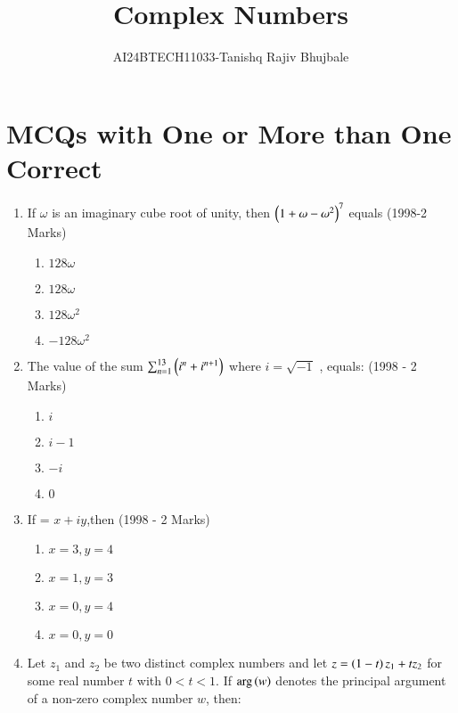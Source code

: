 \documentclass[journal,12pt,twocolumn]{IEEEtran}
\theoremstyle{remark}
\begin{document}

\vspace{3cm}
\title{Complex Numbers}
\author{AI24BTECH11033-Tanishq Rajiv Bhujbale}
\maketitle
\newpage
\bigskip

\renewcommand{\thefigure}{\theenumi}
\renewcommand{\thetable}{\theenumi}

\section{MCQs with One or More than One Correct}
\begin{enumerate}
    \item If $\omega$ is an imaginary cube root of unity, then 
    $\left(1 + \omega - \omega^2\right)^7$ equals \hfill (1998-2 Marks)
    \begin{enumerate}[label=(\alph*)]
    \item $128\omega$    
    \item $128\omega$
    \item $128\omega^2$
    \item $-128\omega^2$
    \end{enumerate}
    \item The value of the sum 
   $\sum_{n=1}^{13} \left(i^n + i^{n+1}\right)$
where  $i = \sqrt{-1}$ , equals: \hfill (1998 - 2 Marks)
\begin{multicols}{4}
    \begin{enumerate}[label=(\alph*)]
    \item $i$
    \item $i - 1$
    \item $-i$
    \item $0$
    \end{enumerate}
\end{multicols}
    \item If 
    = $ x + iy $,then \hfill (1998 - 2 Marks)
\begin{enumerate}[label=(\alph*)]
    \item $x=3,y=4$    
    \item $x=1,y=3$ 
    \item $x=0,y=4$
    \item $x=0,y=0$
    \end{enumerate}
    \item Let $ z_1 $ and $ z_2 $ be two distinct complex numbers and let $ z = \left(1 - t\right) z_1 + t z_2 $ for some real number $ t $ with $ 0 < t < 1 $. If $ \mathrm{arg}\left(w\right) $ denotes the principal argument of a non-zero complex number $ w $, then: 

\end{enumerate}
\end{document}
